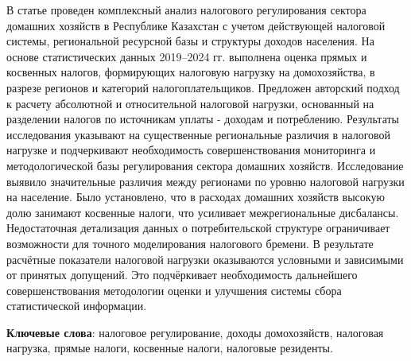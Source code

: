 В статье проведен комплексный анализ налогового регулирования сектора
домашних хозяйств в Республике Казахстан с учетом действующей налоговой
системы, региональной ресурсной базы и структуры доходов населения. На
основе статистических данных 2019--2024 гг. выполнена оценка прямых и
косвенных налогов, формирующих налоговую нагрузку на домохозяйства, в
разрезе регионов и категорий налогоплательщиков. Предложен авторский
подход к расчету абсолютной и относительной налоговой нагрузки,
основанный на разделении налогов по источникам уплаты - доходам и
потреблению. Результаты исследования указывают на существенные
региональные различия в налоговой нагрузке и подчеркивают необходимость
совершенствования мониторинга и методологической базы регулирования
сектора домашних хозяйств. Исследование выявило значительные различия
между регионами по уровню налоговой нагрузки на население. Было
установлено, что в расходах домашних хозяйств высокую долю занимают
косвенные налоги, что усиливает межрегиональные дисбалансы.
Недостаточная детализация данных о потребительской структуре
ограничивает возможности для точного моделирования налогового бремени. В
результате расчётные показатели налоговой нагрузки оказываются условными
и зависимыми от принятых допущений. Это подчёркивает необходимость
дальнейшего совершенствования методологии оценки и улучшения системы
сбора статистической информации.

{\bfseries Ключевые слова}: налоговое регулирование, доходы домохозяйств,
налоговая нагрузка, прямые налоги, косвенные налоги, налоговые
резиденты.

